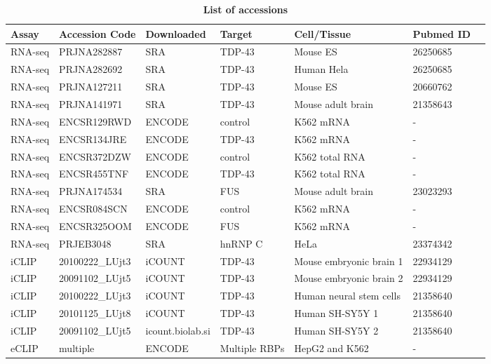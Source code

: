 \begin{table}[h!]
	\caption{\textbf{List of accessions}}
	\label{table:cryptic_data}
	\begin{footnotesize}
		\begin{tabular}{lllllll}
			Assay & Accession Code & Downloaded & Target & Cell/Tissue & Pubmed ID\\
			\hline
			RNA-seq & PRJNA282887 & SRA\footnotemark & TDP-43 & Mouse ES  & 26250685 \\
			RNA-seq & PRJNA282692 & SRA & TDP-43 & Human Hela & 26250685 \\
			RNA-seq & PRJNA127211 & SRA & TDP-43 & Mouse ES & 20660762\\
			RNA-seq & PRJNA141971 & SRA & TDP-43 & Mouse adult brain & 21358643 \\
			RNA-seq & ENCSR129RWD & ENCODE\footnotemark & control & K562 mRNA & -\\
			RNA-seq & ENCSR134JRE & ENCODE & TDP-43 & K562 mRNA & -\\
			RNA-seq & ENCSR372DZW & ENCODE & control & K562 total RNA & -\\
			RNA-seq & ENCSR455TNF & ENCODE & TDP-43 & K562 total RNA & -\\
			RNA-seq & PRJNA174534 & SRA & FUS & Mouse adult brain & 23023293 \\
			RNA-seq & ENCSR084SCN & ENCODE & control & K562 mRNA & -\\
			RNA-seq & ENCSR325OOM & ENCODE & FUS & K562 mRNA & -\\
			RNA-seq & PRJEB3048 & SRA & hnRNP C & HeLa & 23374342 \\
			iCLIP & 20100222\_LUjt3 & iCOUNT\footnotemark & TDP-43 & Mouse embryonic brain 1 & 22934129\\
			iCLIP & 20091102\_LUjt5	& iCOUNT & TDP-43 & Mouse embryonic brain 2 & 22934129\\
			iCLIP & 20100222\_LUjt3 & iCOUNT & TDP-43 & Human neural stem cells & 21358640\\
			iCLIP & 20101125\_LUjt8 & iCOUNT & TDP-43 & Human SH-SY5Y 1 & 21358640\\
			iCLIP & 20091102\_LUjt5 & icount.biolab.si & TDP-43 & Human SH-SY5Y 2 & 21358640\\
			eCLIP & multiple & ENCODE & Multiple RBPs & HepG2 and K562 & -
		\end{tabular}
	\end{footnotesize}
	

\end{table}

